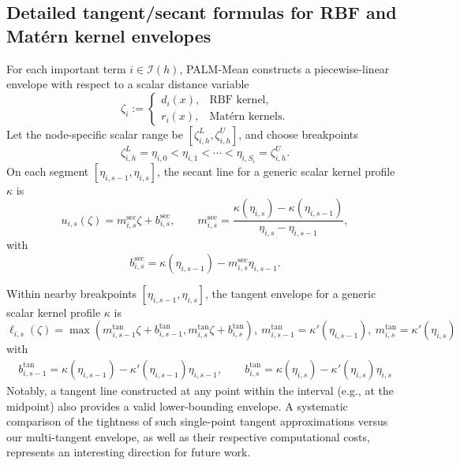 \documentclass[pdflatex,sn-mathphys-num]{sn-jnl}%
\theoremstyle{thmstyleone}%
\theoremstyle{thmstyletwo}%
\theoremstyle{thmstylethree}%
\begin{document}
\subsection{Detailed tangent/secant formulas for RBF and Mat\'ern kernel envelopes}
\label{app:tangent_secant}

For each important term $i\in\mathcal{I}(h)$, PALM-Mean constructs a piecewise-linear envelope with respect to a scalar distance variable
\[
\zeta_i
:=
\begin{cases}
d_i(x), & \text{RBF kernel},\\
r_i(x), & \text{Mat\'ern kernels}.
\end{cases}
\]
Let the node-specific scalar range be $[\zeta_{i,h}^L,\zeta_{i,h}^U]$, and choose breakpoints
\[
\zeta_{i,h}^L=\eta_{i,0}<\eta_{i,1}<\cdots<\eta_{i,S_i}=\zeta_{i,h}^U.
\]
On each segment $[\eta_{i,s-1},\eta_{i,s}]$, the secant line for a generic scalar kernel profile $\kappa$ is
\begin{equation}
u_{i,s}(\zeta)
=
m^{\mathrm{sec}}_{i,s}\zeta+b^{\mathrm{sec}}_{i,s},
\qquad
m^{\mathrm{sec}}_{i,s}
=
\frac{\kappa(\eta_{i,s})-\kappa(\eta_{i,s-1})}{\eta_{i,s}-\eta_{i,s-1}},
\label{eq:app_secant}
\end{equation}
with
\[
b^{\mathrm{sec}}_{i,s}
=
\kappa(\eta_{i,s-1})-m^{\mathrm{sec}}_{i,s}\eta_{i,s-1}.
\]


Within nearby breakpoints $[\eta_{i,s-1},\eta_{i,s}]$, the tangent envelope for a generic scalar kernel profile $\kappa$ is
\begin{equation}
\ell_{i,s}(\zeta)= \max(m^{\mathrm{tan}}_{i,s-1}\zeta+b^{\mathrm{tan}}_{i,s-1}, m^{\mathrm{tan}}_{i,s}\zeta+b^{\mathrm{tan}}_{i,s}),~
m^{\mathrm{tan}}_{i,s-1}=\kappa'(\eta_{i,s-1}), ~ m^{\mathrm{tan}}_{i,s}=\kappa'(\eta_{i,s})
\label{eq:app_tangent}
\end{equation}
with
\begin{align*}
    b^{\mathrm{tan}}_{i,s-1} = \kappa(\eta_{i,s-1}) - \kappa'(\eta_{i,s-1})\eta_{i,s-1}, \qquad b^{\mathrm{tan}}_{i,s} = \kappa(\eta_{i,s}) - \kappa'(\eta_{i,s})\eta_{i,s}
\end{align*}
Notably, a tangent line constructed at any point within the interval (e.g., at the midpoint) also provides a valid lower-bounding envelope. A systematic comparison of the tightness of such single-point tangent approximations versus our multi-tangent envelope, as well as their respective computational costs, represents an interesting direction for future work.
\end{document}
